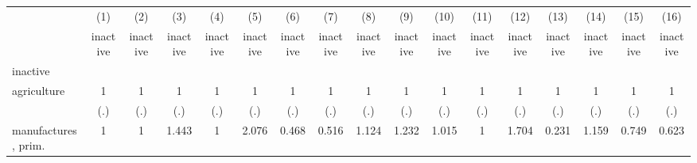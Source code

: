 {
\def\sym#1{\ifmmode^{#1}\else\(^{#1}\)\fi}
\begin{tabular}{l*{16}{c}}
\hline\hline
                    &\multicolumn{1}{c}{(1)}&\multicolumn{1}{c}{(2)}&\multicolumn{1}{c}{(3)}&\multicolumn{1}{c}{(4)}&\multicolumn{1}{c}{(5)}&\multicolumn{1}{c}{(6)}&\multicolumn{1}{c}{(7)}&\multicolumn{1}{c}{(8)}&\multicolumn{1}{c}{(9)}&\multicolumn{1}{c}{(10)}&\multicolumn{1}{c}{(11)}&\multicolumn{1}{c}{(12)}&\multicolumn{1}{c}{(13)}&\multicolumn{1}{c}{(14)}&\multicolumn{1}{c}{(15)}&\multicolumn{1}{c}{(16)}\\
                    &\multicolumn{1}{c}{inactive}&\multicolumn{1}{c}{inactive}&\multicolumn{1}{c}{inactive}&\multicolumn{1}{c}{inactive}&\multicolumn{1}{c}{inactive}&\multicolumn{1}{c}{inactive}&\multicolumn{1}{c}{inactive}&\multicolumn{1}{c}{inactive}&\multicolumn{1}{c}{inactive}&\multicolumn{1}{c}{inactive}&\multicolumn{1}{c}{inactive}&\multicolumn{1}{c}{inactive}&\multicolumn{1}{c}{inactive}&\multicolumn{1}{c}{inactive}&\multicolumn{1}{c}{inactive}&\multicolumn{1}{c}{inactive}\\
\hline
inactive            &                     &                     &                     &                     &                     &                     &                     &                     &                     &                     &                     &                     &                     &                     &                     &                     \\
agriculture         &           1         &           1         &           1         &           1         &           1         &           1         &           1         &           1         &           1         &           1         &           1         &           1         &           1         &           1         &           1         &           1         \\
                    &         (.)         &         (.)         &         (.)         &         (.)         &         (.)         &         (.)         &         (.)         &         (.)         &         (.)         &         (.)         &         (.)         &         (.)         &         (.)         &         (.)         &         (.)         &         (.)         \\
[1em]
manufactures, prim. &           1         &           1         &       1.443         &           1         &       2.076         &       0.468         &       0.516         &       1.124         &       1.232         &       1.015         &           1         &       1.704         &       0.231         &       1.159         &       0.749         &       0.623         \\

\end{tabular}}
